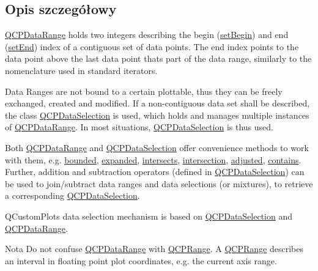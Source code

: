 \subsection{Opis szczegółowy}
\hyperlink{class_q_c_p_data_range}{Q\+C\+P\+Data\+Range} holds two integers describing the begin (\hyperlink{class_q_c_p_data_range_a54ff59048e01e46ac4aefafc844626c6}{set\+Begin}) and end (\hyperlink{class_q_c_p_data_range_a277f1a9eafe70b9184d9c00b641ae5de}{set\+End}) index of a contiguous set of data points. The end index points to the data point above the last data point that\textquotesingle{}s part of the data range, similarly to the nomenclature used in standard iterators.

Data Ranges are not bound to a certain plottable, thus they can be freely exchanged, created and modified. If a non-\/contiguous data set shall be described, the class \hyperlink{class_q_c_p_data_selection}{Q\+C\+P\+Data\+Selection} is used, which holds and manages multiple instances of \hyperlink{class_q_c_p_data_range}{Q\+C\+P\+Data\+Range}. In most situations, \hyperlink{class_q_c_p_data_selection}{Q\+C\+P\+Data\+Selection} is thus used.

Both \hyperlink{class_q_c_p_data_range}{Q\+C\+P\+Data\+Range} and \hyperlink{class_q_c_p_data_selection}{Q\+C\+P\+Data\+Selection} offer convenience methods to work with them, e.\+g. \hyperlink{class_q_c_p_data_range_a4de1bec5a6e1145bd332d93ac2cc8327}{bounded}, \hyperlink{class_q_c_p_data_range_a92eb8e85db62f0f833486fa4521fb586}{expanded}, \hyperlink{class_q_c_p_data_range_afda3603f6ca7cb5c518cdaeea45af267}{intersects}, \hyperlink{class_q_c_p_data_range_a2c56cbc35c3beaed34fca1839d570520}{intersection}, \hyperlink{class_q_c_p_data_range_a7a7a144cd3df55a6e011b9a84f0f8b69}{adjusted}, \hyperlink{class_q_c_p_data_range_a691620b718e4bcefb77bcdde88bd1b34}{contains}. Further, addition and subtraction operators (defined in \hyperlink{class_q_c_p_data_selection}{Q\+C\+P\+Data\+Selection}) can be used to join/subtract data ranges and data selections (or mixtures), to retrieve a corresponding \hyperlink{class_q_c_p_data_selection}{Q\+C\+P\+Data\+Selection}.

Q\+Custom\+Plot\textquotesingle{}s data selection mechanism is based on \hyperlink{class_q_c_p_data_selection}{Q\+C\+P\+Data\+Selection} and \hyperlink{class_q_c_p_data_range}{Q\+C\+P\+Data\+Range}.

\begin{DoxyNote}{Nota}
Do not confuse \hyperlink{class_q_c_p_data_range}{Q\+C\+P\+Data\+Range} with \hyperlink{class_q_c_p_range}{Q\+C\+P\+Range}. A \hyperlink{class_q_c_p_range}{Q\+C\+P\+Range} describes an interval in floating point plot coordinates, e.\+g. the current axis range. 
\end{DoxyNote}



